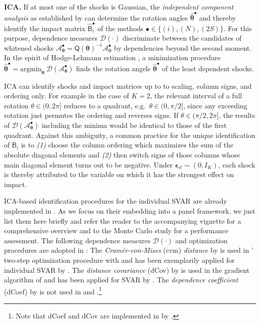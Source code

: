 \textbf{ICA.} If at most one of the shocks is Gaussian, the \textit{independent component analysis} as established by \citet{Comon1994} can determine the rotation angles $ \boldsymbol{\widehat{\theta}}^{\bullet} $ and thereby identify the impact matrix $ \widehat{\mathsf{B}}_i^{\bullet} $ of the methods $ \bullet \in \lbrace (i), (N), (2S) \rbrace $. For this purpose, dependence measures $ \mathcal{D}(\cdot) $ discriminate between the candidates of whitened shocks $ \mathcal{A}_{\boldsymbol{\theta}}^{\bullet} = \mathsf{Q} \left( \boldsymbol{\theta} \right)^{-1} \mathcal{A}_{\boldsymbol{0}}^{\bullet} $ by dependencies beyond the second moment. In the spirit of Hodge-Lehmann estimation \citeyearpar{HodgesLehmann1963}, a minimization procedure $ \boldsymbol{\widehat{\theta}}^{\bullet} = \text{argmin}_{\boldsymbol{\theta}} \ \mathcal{D} \left( \mathcal{A}_{\boldsymbol{\theta}}^{\bullet} \right) $ finds the rotation angels $ \boldsymbol{\widehat{\theta}}^{\bullet} $ of the least dependent shocks. 

ICA can identify shocks and impact matrices up to to scaling, column signs, and ordering only. For example in the case of $ K=2 $, the relevant interval of a full rotation $ \theta \in (0, 2\pi] $ reduces to a quadrant, e.g.~$ \theta \in (0, \pi/2] $, since any exceeding rotation just permutes the ordering and reverses signs. If $ \theta \in (\pi/2, 2\pi] $, the results of $ \mathcal{D} \left( \mathcal{A}_{\boldsymbol{\theta}}^{\bullet} \right) $ including the minima would be identical to those of the first quadrant. Against this ambiguity, a common practice for the unique identification of $ \mathsf{B}_i $ is to \textit{(1)} choose the column ordering which maximizes the sum of the absolute diagonal elements and \textit{(2)} then switch signs of those columns whose main diagonal element turns out to be negative. Under $ \boldsymbol{\epsilon}_{it} \sim ( 0, I_K ) $, each shock is thereby attributed to the variable on which it has the strongest effect on impact.

ICA-based identification procedures for the individual SVAR are already implemented in . As we focus on their embedding into a panel framework, we just list them here briefly and refer the reader to the accompanying vignette \citep{LangeEtAl_fc} for a comprehensive overview and to the Monte Carlo study \citep{HerwartzEtAl2021} for a performance assessment. The following dependence measures $ \mathcal{D}\left( \cdot \right) $ and optimization procedures are adopted in : The \textit{Cramér-von-Mises} (cvm) \textit{distance} by \citet{GenestEtAl2007} is used in ' two-step optimization procedure with  \citep{KojadinovicYan2010} and has been exemplarily applied for individual SVAR by \citet{Herwartz2018}. The \textit{distance covariance} (dCov) by \cite{Szekely2007} is used in the gradient algorithm of  \citep{RiskEtAl2015} and has been applied for SVAR by \citet{MattesonTsay2017}. The \textit{dependence coefficient} (dCoef) by \citet{BakirovEtAl2006} is not used in  and .\footnote{Note that dCoef and dCov are implemented in  by \citet{RizzoSzekely2022}.} 


